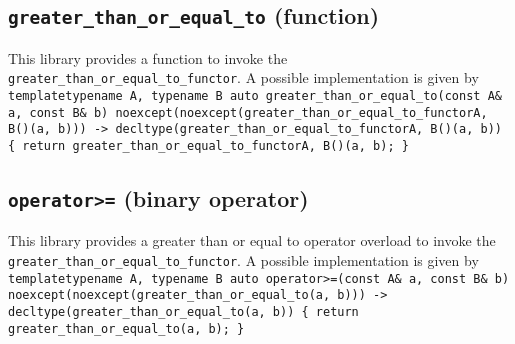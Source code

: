 \documentclass[oneside]{book}
\begin{document}
\subsection{\texttt{greater\_than\_or\_equal\_to} (function)}
This library provides a function to invoke the \texttt{greater\_than\_or\_equal\_to\_functor}.
A possible implementation is given by\newline
\texttt{template\textlangle typename A, typename B\textrangle\newline
auto\newline
greater\_than\_or\_equal\_to(const A\& a, const B\& b)\newline
noexcept(noexcept(greater\_than\_or\_equal\_to\_functor\textlangle A, B\textrangle()(a, b)))\newline
-> decltype(greater\_than\_or\_equal\_to\_functor\textlangle A, B\textrangle()(a, b))\newline
\{ return greater\_than\_or\_equal\_to\_functor\textlangle A, B\textrangle()(a, b); \}}

\subsection{\texttt{operator>=} (binary operator)}
This library provides a greater than or equal to operator overload to invoke the \texttt{greater\_than\_or\_equal\_to\_functor}.
A possible implementation is given by\newline
\texttt{template\textlangle typename A, typename B\textrangle\newline
auto\newline
operator>=(const A\& a, const B\& b)\newline
noexcept(noexcept(greater\_than\_or\_equal\_to(a, b)))\newline
-> decltype(greater\_than\_or\_equal\_to(a, b))\newline
\{ return greater\_than\_or\_equal\_to(a, b); \}}


\end{document}
